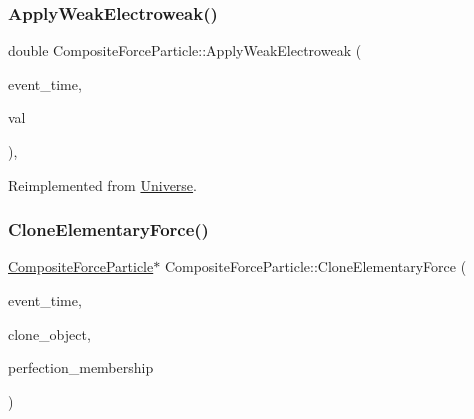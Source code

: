 \subsubsection{\texorpdfstring{Apply\+Weak\+Electroweak()}{ApplyWeakElectroweak()}}
{\footnotesize\ttfamily double Composite\+Force\+Particle\+::\+Apply\+Weak\+Electroweak (\begin{DoxyParamCaption}\item[{std\+::chrono\+::time\+\_\+point$<$ \mbox{\hyperlink{universe_8h_a0ef8d951d1ca5ab3cfaf7ab4c7a6fd80}{Clock}} $>$}]{event\+\_\+time,  }\item[{double}]{val }\end{DoxyParamCaption})\hspace{0.3cm}{\ttfamily [inline]}, {\ttfamily [virtual]}}



Reimplemented from \mbox{\hyperlink{classUniverse_a46a906baabb63e5d31f8b48ea1fae52e}{Universe}}.

\mbox{\label{classCompositeForceParticle_a8163b425c10bd9cb9097d99e5d53d0a1}} 
\subsubsection{\texorpdfstring{Clone\+Elementary\+Force()}{CloneElementaryForce()}}
{\footnotesize\ttfamily \mbox{\hyperlink{classCompositeForceParticle}{Composite\+Force\+Particle}}$\ast$ Composite\+Force\+Particle\+::\+Clone\+Elementary\+Force (\begin{DoxyParamCaption}\item[{std\+::chrono\+::time\+\_\+point$<$ \mbox{\hyperlink{universe_8h_a0ef8d951d1ca5ab3cfaf7ab4c7a6fd80}{Clock}} $>$}]{event\+\_\+time,  }\item[{\mbox{\hyperlink{classCompositeForceParticle}{Composite\+Force\+Particle}} $\ast$}]{clone\+\_\+object,  }\item[{double}]{perfection\+\_\+membership }\end{DoxyParamCaption})}

\mbox{\label{classCompositeForceParticle_a2e620a92eaca67dbb482a7fd8e248f7b}} 
